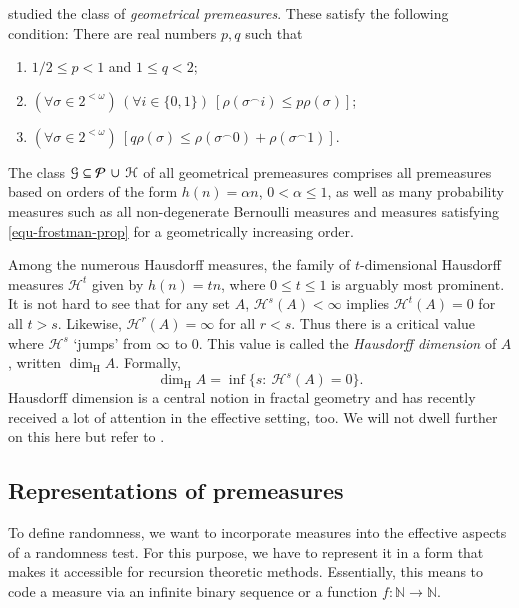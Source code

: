 \documentclass[11pt,reqno]{article}
\theoremstyle{plain}
\theoremstyle{definition}
\theoremstyle{remark}
\numberwithin{equation}{section}
\newcommand{\Bit}{\ensuremath{\{0,1\}}}
\newcommand{\Nat}{\ensuremath{\mathbb{N}}}
\newcommand{\Str}[1][<\omega]{\ensuremath{2^{#1}}}
\newcommand{\Conc}{\ensuremath{\mbox{}^\frown}}
\newcommand{\Hmeas}{\ensuremath{\mathcal{H}}}
\newcommand{\Hm}[1]{\ensuremath{\Hmeas^{#1}}}
\newcommand{\Hdim}[1][\mbox{}]{\ensuremath{\dim^{#1}_{\operatorname{H}}}}
\newcommand{\Pmeas}{\ensuremath{\CMcal{P}}}
\begin{document}
\citet{reimann-stephan:2005} studied the class of \emph{geometrical premeasures}. These satisfy the following condition: There 
are real numbers $p,q$ such that
\begin{enumerate}[(G1)]
\item $1/2 \leq p < 1$ and $1 \leq q < 2$;
\item $(\forall \sigma \in \Str) \, (\forall i \in \Bit) \: [\rho(\sigma \Conc i) \leq
p\rho(\sigma)]$;
\item $(\forall \sigma \in \Str) \: [q \rho(\sigma) \leq \rho(\sigma \Conc 0)+\rho(\sigma \Conc 1)]$.
\end{enumerate}

The class $\mathcal{G} \subseteq  \Pmeas \, \cup\, \Hmeas$ of all geometrical premeasures comprises all premeasures based on orders of the form $h(n) = \alpha n$, $0 < \alpha \leq 1$, as well as many probability measures such as all non-degenerate Bernoulli measures and measures satisfying \eqref{equ-frostman-prop} for a geometrically increasing order.

\medskip
Among the numerous Hausdorff measures, the family of $t$-dimensional Hausdorff measures $\Hm{t}$ given by $h(n) = tn$, where $0\leq t \leq 1 $ is arguably most prominent. It is not hard to see that for any set $A$, $\Hm{s}(A) < \infty$ implies $\Hm{t}(A) = 0$ for all $t > s$. Likewise, $\Hm{r}(A) = \infty$ for all $r < s$. Thus there is a critical value where $\Hm{s}$ `jumps' from $\infty$ to $0$. This value is called the \emph{Hausdorff dimension} of $A$, written $\Hdim A$. Formally,
\[
	\Hdim A = \inf \{ s : \: \Hm{s}(A) = 0 \}.
\]
Hausdorff dimension is a central notion in fractal geometry and has recently received a lot of attention in the effective setting, too. We will not dwell further on this here but refer to  \citep{falconer:1990, mattila:1995, lutz:2003, reimann:2004}.



%
%
\subsection{Representations of premeasures} \label{subsec-repres-premeas}

To define randomness, we want to incorporate measures into the effective aspects of a randomness test. For this purpose, we have to represent it in a form that makes it accessible for recursion theoretic methods. Essentially, this means to code a measure via an infinite binary sequence or a function $f:\Nat \to \Nat$.
\end{document}
